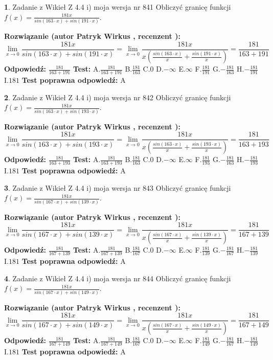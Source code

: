 \documentclass[12pt, a4paper]{article}
\theoremstyle{definition} %
\newtheorem{zad}{}
\newcommand{\zadStart}[1]{\begin{zad}#1\newline}
\newcommand{\zadStop}{\end{zad}}
\newcommand{\rozwStart}[2]{\noindent \textbf{Rozwiązanie (autor #1 , recenzent #2): }\newline}
\newcommand{\rozwStop}{\newline}
\newcommand{\odpStart}{\noindent \textbf{Odpowiedź:}\newline}
\newcommand{\odpStop}{\newline}
\newcommand{\testStart}{\noindent \textbf{Test:}\newline}
\newcommand{\testStop}{\newline}
\newcommand{\kluczStart}{\noindent \textbf{Test poprawna odpowiedź:}\newline}
\newcommand{\kluczStop}{\newline}
\begin{document}
\zadStart{Zadanie z Wikieł Z 4.4 i) moja wersja nr 841}
Obliczyć granicę funkcji $f(x)=\frac{181x}{sin(163\cdot x) +sin(191\cdot x)}$.
\zadStop
\rozwStart{Patryk Wirkus}{}
$$\lim\limits_{x\to 0}\frac{181x}{sin(163\cdot x) +sin(191\cdot x)}=\lim\limits_{x\to 0}\frac{181x}{x(\frac{sin(163\cdot x)}{x}+\frac{sin(191\cdot x)}{x})}=\frac{181}{163+191}$$
\rozwStop
\odpStart
$\frac{181}{163+191}$
\odpStop
\testStart
A.$\frac{181}{163+191}$
B.$\frac{181}{163}$
C.$0$
D.$-\infty$
E.$\infty$
F.$\frac{181}{191}$
G.$-\frac{181}{163}$
H.$-\frac{181}{191}$
I.$181$
\testStop
\kluczStart
A
\kluczStop



\zadStart{Zadanie z Wikieł Z 4.4 i) moja wersja nr 842}
Obliczyć granicę funkcji $f(x)=\frac{181x}{sin(163\cdot x) +sin(193\cdot x)}$.
\zadStop
\rozwStart{Patryk Wirkus}{}
$$\lim\limits_{x\to 0}\frac{181x}{sin(163\cdot x) +sin(193\cdot x)}=\lim\limits_{x\to 0}\frac{181x}{x(\frac{sin(163\cdot x)}{x}+\frac{sin(193\cdot x)}{x})}=\frac{181}{163+193}$$
\rozwStop
\odpStart
$\frac{181}{163+193}$
\odpStop
\testStart
A.$\frac{181}{163+193}$
B.$\frac{181}{163}$
C.$0$
D.$-\infty$
E.$\infty$
F.$\frac{181}{193}$
G.$-\frac{181}{163}$
H.$-\frac{181}{193}$
I.$181$
\testStop
\kluczStart
A
\kluczStop



\zadStart{Zadanie z Wikieł Z 4.4 i) moja wersja nr 843}
Obliczyć granicę funkcji $f(x)=\frac{181x}{sin(167\cdot x) +sin(139\cdot x)}$.
\zadStop
\rozwStart{Patryk Wirkus}{}
$$\lim\limits_{x\to 0}\frac{181x}{sin(167\cdot x) +sin(139\cdot x)}=\lim\limits_{x\to 0}\frac{181x}{x(\frac{sin(167\cdot x)}{x}+\frac{sin(139\cdot x)}{x})}=\frac{181}{167+139}$$
\rozwStop
\odpStart
$\frac{181}{167+139}$
\odpStop
\testStart
A.$\frac{181}{167+139}$
B.$\frac{181}{167}$
C.$0$
D.$-\infty$
E.$\infty$
F.$\frac{181}{139}$
G.$-\frac{181}{167}$
H.$-\frac{181}{139}$
I.$181$
\testStop
\kluczStart
A
\kluczStop



\zadStart{Zadanie z Wikieł Z 4.4 i) moja wersja nr 844}
Obliczyć granicę funkcji $f(x)=\frac{181x}{sin(167\cdot x) +sin(149\cdot x)}$.
\zadStop
\rozwStart{Patryk Wirkus}{}
$$\lim\limits_{x\to 0}\frac{181x}{sin(167\cdot x) +sin(149\cdot x)}=\lim\limits_{x\to 0}\frac{181x}{x(\frac{sin(167\cdot x)}{x}+\frac{sin(149\cdot x)}{x})}=\frac{181}{167+149}$$
\rozwStop
\odpStart
$\frac{181}{167+149}$
\odpStop
\testStart
A.$\frac{181}{167+149}$
B.$\frac{181}{167}$
C.$0$
D.$-\infty$
E.$\infty$
F.$\frac{181}{149}$
G.$-\frac{181}{167}$
H.$-\frac{181}{149}$
I.$181$
\testStop
\kluczStart
A
\kluczStop
\end{document}
